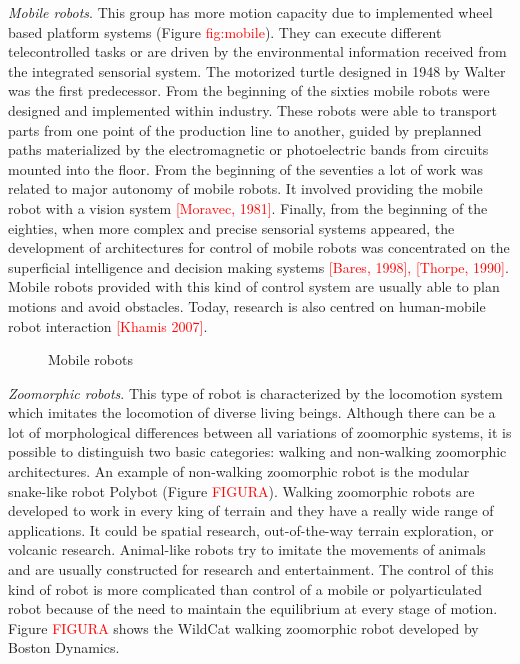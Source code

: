 \textit{Mobile robots}. This group has more motion capacity due to implemented wheel based platform systems (Figure \textcolor{red}{fig:mobile}). They can execute different telecontrolled tasks or are driven by the environmental information received from the integrated sensorial system. The motorized turtle designed in 1948 by Walter was the first predecessor. From the beginning of the sixties mobile robots were designed and implemented within industry. These robots were able to transport parts from one point of the production line to another, guided by preplanned paths materialized by the electromagnetic or photoelectric bands from circuits mounted into the floor. From the beginning of the seventies a lot of work was related to major autonomy of mobile robots. It involved providing the mobile robot with a vision system \textcolor{red}{[Moravec, 1981]}. Finally, from the beginning of the eighties, when more complex and precise sensorial systems appeared, the development of architectures for control of mobile robots was concentrated on the superficial intelligence and decision making systems \textcolor{red}{[Bares, 1998], [Thorpe, 1990]}. Mobile robots provided with this kind of control system are usually able to plan motions and avoid obstacles. Today, research is also centred on human-mobile robot interaction \textcolor{red}{[Khamis 2007]}. 

\begin{figure}[!hbt]
\centering
{}\hspace{10mm}
\caption{Mobile robots}
\label{fig:mobile}
\end{figure}

\textit{Zoomorphic robots}. This type of robot is characterized by the locomotion system which imitates the locomotion of diverse living beings. Although there can be a lot of morphological differences between all variations of zoomorphic systems, it is possible to distinguish two basic categories: walking and non-walking zoomorphic architectures. An example of non-walking zoomorphic robot is the modular snake-like robot Polybot (Figure \textcolor{red}{FIGURA}). Walking zoomorphic robots are developed to work in every king of terrain and they have a really wide range of applications. It could be spatial research, out-of-the-way terrain exploration, or volcanic research. Animal-like robots try to imitate the movements of animals and are usually constructed for research and entertainment. The control of this kind of robot is more complicated than control of a mobile or polyarticulated robot because of the need to maintain the equilibrium at every stage of motion. Figure \textcolor{red}{FIGURA} shows the WildCat walking zoomorphic robot developed by Boston Dynamics.

